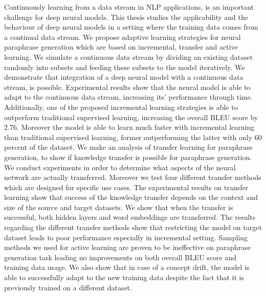 \documentclass[12pt,final,twoside]{report}
\theoremstyle{plain}
\theoremstyle{definition}
\theoremstyle{remark}
\begin{document}
Continuously learning from a data stream in NLP applications, is an important challenge for deep neural models. This thesis studies the applicability and the behaviour of deep neural models in a setting where the training data comes from a continual data stream. We propose adaptive learning strategies for neural paraphrase generation which are based on incremental, transfer and active learning. We simulate a continuous data stream by dividing an existing dataset randomly into subsets and feeding these subsets to the model iteratively. We demonstrate that integration of a deep neural model with a continuous data stream, is possible. Experimental results show that the neural model is able to adapt to the continuous data stream, increasing its' performance through time. Additionally, one of the proposed incremental learning strategies is able to outperform traditional supervised learning, increasing the overall BLEU score by 2.76. Moreover the model is able to learn much faster with incremental learning than traditional supervised learning, former outperforming the latter with only 60 percent of the dataset. We make an analysis of transfer learning for paraphrase generation, to show if knowledge transfer is possible for paraphrase generation. We conduct experiments in order to determine what aspects of the neural network are actually transferred. Moreover we test four different transfer methods which are designed for specific use cases. The experimental results on transfer learning show that success of the knowledge transfer depends on the context and size of the source and target datasets. We show that when the transfer is successful, both hidden layers and word embeddings are transferred. The results regarding the different transfer methods show that restricting the model on target dataset leads to poor performance especially in incremental setting. Sampling methods we used for active learning are proven to be ineffective on paraphrase generation task leading no improvements on both overall BLEU score and training data usage. We also show that in case of a concept drift, the model is able to successfully adapt to the new training data despite the fact that it is previously trained on a different dataset.


	


\end{document}
